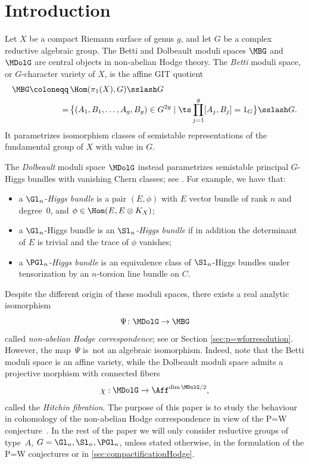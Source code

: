 \section{Introduction}

Let $X$ be a compact Riemann surface of genus $g$, and let $G$ be a complex reductive algebraic group. The Betti and Dolbeault moduli spaces $\MBG$ and $\MDolG$ are central objects in non-abelian Hodge theory. The \emph{Betti} moduli space, or $G$\nobreakdash-char\-acter variety of $X$, is the affine GIT quotient
\begin{equation}
\begin{aligned}\label{eq:charactervar} \MBG \coloneqq&\,\Hom(\pi_1(X), G)\sslash G \\
=&\,\big\{ (A_1, B_1, \ldots, A_{g}, B_{g}) \in G^{2g} \mid \ts\prod^{g}_{j=1}[A_j, B_j]=1_{G} \big\}\sslash G.
\end{aligned}
\end{equation}
It parametrizes isomorphism classes of semistable representations of the fundamental group of $X$ with value in $G$.

The \emph{Dolbeault} moduli space $\MDolG$ instead parametrizes semistable principal $G$-Higgs bundles with vanishing Chern classes; see \cite{Simpson1994I}. For example, we have that:
\begin{itemize}
\item a \emph{$\Gl_n$-Higgs bundle} is a pair $(E, \phi)$ with $E$ vector bundle of rank $n$ and degree~$0$, and $\phi \in \Hom(E, E \otimes K_X)$;
\item a $\Gl_n$-Higgs bundle is an \emph{$\Sl_n$-Higgs bundle} if in addition the determinant of $E$ is trivial and the trace of $\phi$ vanishes;
\item a \emph{$\PGl_n$-Higgs bundle} is an equivalence class of $\Sl_n$-Higgs bundles under tensorization by an $n$-torsion line bundle on $C$.
\end{itemize}

Despite the different origin of these moduli spaces, there exists a real analytic isomorphism
\[
\Psi\colon \MDolG \to \MBG
\]
called \emph{non-abelian Hodge correspondence}; see \cite{Simpson1994} or Section \ref{sec:p=wforresolution}. However, the map~$\Psi$ is~not an algebraic isomorphism. Indeed, note that the Betti moduli space is an affine variety, while the Dolbeault moduli space admits a projective morphism with connected fibers
\[
\chi: \MDolG \to \Aff^{\dim\MDolG /2},
\]
called the \emph{Hitchin fibration}. The purpose of this paper is to study the behaviour in cohomology of the non-abelian Hodge correspondence in view of the P=W conjecture~\cite{deCataldoHauselMigliorini2012}. In the rest of the paper we will only consider reductive groups of type~$A$, \ie $G=\Gl_n, \Sl_n, \PGl_n$, unless stated otherwise, \eg in the formulation of the P=W conjectures or in \cref{sec:compactificationHodge}.


